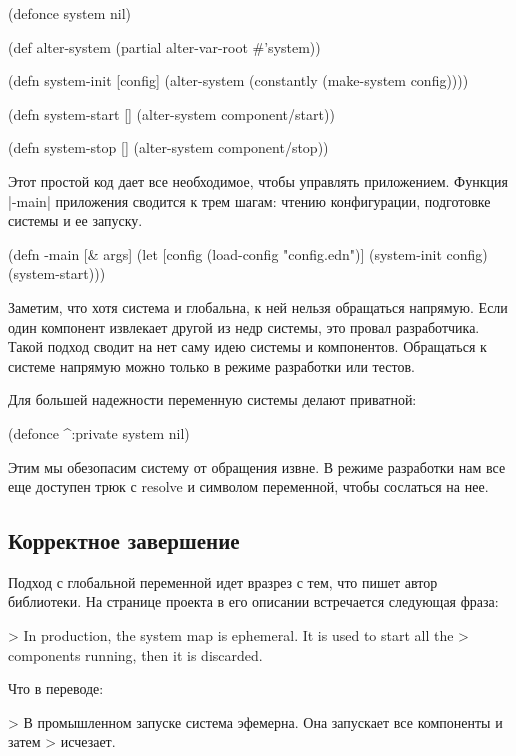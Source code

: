\begin{code}
(defonce system nil)

(def alter-system (partial alter-var-root #'system))

(defn system-init [config]
  (alter-system (constantly (make-system config))))

(defn system-start []
  (alter-system component/start))

(defn system-stop []
  (alter-system component/stop))
\end{code}

Этот простой код дает все необходимое, чтобы управлять приложением. Функция
\spverb|-main| приложения сводится к трем шагам: чтению конфигурации, подготовке
системы и ее запуску.

\begin{code}
(defn -main [& args]
  (let [config (load-config "config.edn")]
    (system-init config)
    (system-start)))
\end{code}

Заметим, что хотя система и глобальна, к ней нельзя обращаться напрямую. Если
один компонент извлекает другой из недр системы, это провал разработчика. Такой
подход сводит на нет саму идею системы и компонентов. Обращаться к системе
напрямую можно только в режиме разработки или тестов.

Для большей надежности переменную системы делают приватной:

\begin{code}
(defonce ^:private system nil)
\end{code}

Этим мы обезопасим систему от обращения извне. В режиме разработки нам все еще
доступен трюк с resolve и символом переменной, чтобы сослаться на нее.

\subsection{Корректное завершение}

Подход с глобальной переменной идет вразрез с тем, что пишет автор
библиотеки. На странице проекта в его описании встречается следующая фраза:

> In production, the system map is ephemeral. It is used to start all the
> components running, then it is discarded.

Что в переводе:

> В промышленном запуске система эфемерна. Она запускает все компоненты и затем
> исчезает.

